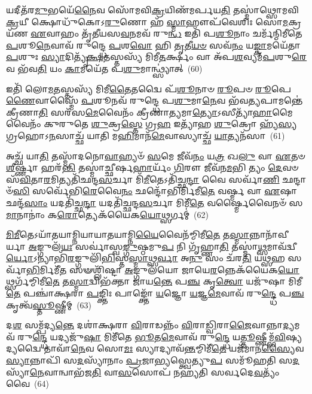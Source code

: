 𑌯𑌦𑍀𑌤᳴𑌰\-\ul{𑌮𑍁}\-𑌭𑌯𑍇᳴\-\ul{𑌨𑍈}\-𑌵 𑌸𑍋᳴𑌮𑌵𑌿\-\ul{𑌕𑍍𑌰}\-𑌯𑌿𑌣᳴𑌮𑌰𑍍𑌪𑌯\-\ul{𑌤𑌿} 𑌤𑌸𑍍𑌮𑌾॑𑌥𑍍𑌸𑍋𑌮𑌵𑌿\-\ul{𑌕𑍍𑌰}\-𑌯𑍀 𑌕𑍍𑌷𑍋𑌧𑍁᳴𑌕𑍋\-𑌽\-\ul{𑌰𑍁}\-𑌣𑍋 𑌹᳴ \ul{𑌸𑍍𑌮𑌾}\-𑌹𑍗𑌪᳴𑌵𑍇𑌶𑌿𑌃 𑌸𑍋\-\ul{𑌮}\-𑌕𑍍𑌰𑌯᳴𑌣 \ul{𑌏}\-𑌵𑌾𑌹𑌂 𑌤𑍃᳴𑌤𑍀𑌯𑌸\-\ul{𑌵}\-𑌨𑌮𑌵᳴ 𑌰𑍁\-\ul{𑌨𑍍𑌧} 𑌇𑌤𑌿᳴ 𑌪\-\ul{𑌶𑍂}\-𑌨𑌾𑌂 𑌚𑌰𑍍𑌮᳴𑌨𑍍𑌮𑌿𑌮𑍀𑌤𑍇 \ul{𑌪}\-𑌶𑍂\-\ul{𑌨𑍇}\-𑌵𑌾𑌵᳴ 𑌰𑍁𑌨𑍍𑌦𑍍𑌧𑍇 \ul{𑌪}\-𑌶\-\ul{𑌵𑍋} 𑌹𑌿 \ul{𑌤𑍃}\-𑌤𑍀\-\ul{𑌯}\-\-\ul{𑍞} 𑌸𑌵᳴\-\ul{𑌨𑌂} 𑌯\-\ul{𑌙𑍍𑌕𑌾}\-𑌮𑌯𑍇᳴𑌤𑌾\-\ul{𑌪}\-𑌶𑍁𑌃 \ul{𑌸𑍍𑌯𑌾}\-𑌦𑌿𑌤𑍍𑌯𑍃᳴\-\ul{𑌕𑍍𑌷}\-𑌤𑌸𑍍𑌤𑌸𑍍𑌯᳴ 𑌮𑌿𑌮𑍀\-\ul{𑌤}\-𑌰𑍍𑌕𑍍𑌷𑌂 𑌵𑌾 𑌅᳴𑌪\-\ul{𑌶}\-𑌵𑍍𑌯𑌮᳴\-\ul{𑌪}\-𑌶𑍁\-\ul{𑌰𑍇}\-𑌵 𑌭᳴𑌵\-\ul{𑌤𑌿} 𑌯𑌂 \ul{𑌕𑌾}\-𑌮𑌯𑍇᳴𑌤 𑌪\-\ul{𑌶𑍁}\-𑌮𑌾𑌨𑍍𑌥𑍍𑌸𑍍𑌯𑌾॑𑌤𑍍~(60)

𑌇𑌤𑌿᳴ 𑌲𑍋\-\ul{𑌮}\-𑌤𑌸𑍍𑌤𑌸𑍍𑌯᳴ 𑌮𑌿𑌮𑍀\-\ul{𑌤𑍈}\-𑌤𑌦𑍍𑌵𑍈 𑌪᳴\-\ul{𑌶𑍂}\-𑌨𑌾𑍞 \ul{𑌰𑍂}\-𑌪𑍞 \ul{𑌰𑍂}\-𑌪𑍇\-\ul{𑌣𑍈}\-𑌵𑌾𑌸𑍍𑌮𑍈᳴ \ul{𑌪}\-𑌶𑍂𑌨𑌵᳴ 𑌰𑍁𑌨𑍍𑌦𑍍𑌧𑍇 𑌪\-\ul{𑌶𑍁}\-𑌮𑌾\-\ul{𑌨𑍇}\-𑌵 𑌭᳴𑌵\-\ul{𑌤𑍍𑌯}\-𑌪𑌾𑌮𑌨𑍍𑌤𑍇॑ 𑌕𑍍𑌰𑍀𑌣𑌾\-\ul{𑌤𑌿} 𑌸𑌰᳴𑌸\-\ul{𑌮𑍇}\-𑌵𑍈𑌨𑌂᳴ 𑌕𑍍𑌰𑍀𑌣𑌾\-\ul{𑌤𑍍𑌯}\-𑌮𑌾\-\ul{𑌤𑍍𑌯𑍋}\-\-𑌽𑌸𑍀𑌤𑍍𑌯𑌾᳴\-\ul{𑌹𑌾}\-𑌮𑍈𑌵𑍈𑌨𑌂᳴ 𑌕𑍁𑌰𑍁𑌤𑍇 \ul{𑌶𑍁}\-𑌕𑍍𑌰\-\ul{𑌸𑍍𑌤𑍇} 𑌗𑍍𑌰\-\ul{𑌹} 𑌇𑌤𑍍𑌯𑌾᳴𑌹 \ul{𑌶𑍁}\-𑌕𑍍𑌰𑍋 𑌹𑍍𑌯᳴\-\ul{𑌸𑍍𑌯} 𑌗𑍍𑌰𑌹𑍋\-𑌽\-\ul{𑌨}\-𑌸𑌾𑌚𑍍𑌛᳴ 𑌯𑌾𑌤𑌿 𑌮\-\ul{𑌹𑌿}\-𑌮𑌾𑌨᳴\-\ul{𑌮𑍇}\-𑌵𑌾𑌸𑍍𑌯𑌾𑌚𑍍𑌛᳴ \ul{𑌯𑌾}\-𑌤𑍍𑌯𑌨᳴𑌸𑌾~(61)

𑌅𑌚𑍍𑌛᳴ 𑌯𑌾\-\ul{𑌤𑌿} 𑌤𑌸𑍍𑌮𑌾᳴𑌦𑌨𑍋\-\ul{𑌵𑌾}\-𑌹𑍍𑌯𑍞᳴ \ul{𑌸}\-𑌮𑍇 𑌜𑍀𑌵᳴\-\ul{𑌨𑌂} 𑌯\-\ul{𑌤𑍍𑌰} 𑌖\-\ul{𑌲𑍁} 𑌵𑌾 \ul{𑌏}\-𑌤𑍞 \ul{𑌶𑍀}\-𑌰𑍍\mbox{}𑌷𑍍𑌣𑌾 𑌹𑌰᳴\-\ul{𑌨𑍍𑌤𑌿} 𑌤𑌸𑍍𑌮𑌾॑𑌚𑍍𑌛𑍀𑌰𑍍\mbox{}𑌷\-\ul{𑌹𑌾}\-𑌰𑍍𑌯𑌂᳴ \ul{𑌗𑌿}\-𑌰𑍗 𑌜𑍀𑌵᳴𑌨\-\ul{𑌮}\-𑌭𑌿 𑌤𑍍𑌯𑌂 \ul{𑌦𑍇}\-𑌵𑍞 𑌸᳴\-\ul{𑌵𑌿}\-𑌤𑌾\-\ul{𑌰}\-𑌮𑌿𑌤𑍍𑌯𑌤𑌿᳴𑌛𑌨𑍍𑌦\-\ul{𑌸}\-𑌰𑍍𑌚𑌾 𑌮𑌿᳴\-\ul{𑌮𑍀}\-𑌤𑍇\-𑌽𑌤𑌿᳴𑌚𑍍𑌛\-\ul{𑌨𑍍𑌦𑌾} 𑌵𑍈 𑌸𑌰𑍍𑌵𑌾᳴\-\ul{𑌣𑌿} 𑌛𑌨𑍍𑌦𑌾𑍞᳴\-\ul{𑌸𑌿} 𑌸𑌰𑍍𑌵𑍇᳴𑌭𑌿\-\ul{𑌰𑍇}\-𑌵𑍈\-\ul{𑌨𑌂} 𑌛𑌨𑍍𑌦𑍋᳴𑌭𑌿𑌰𑍍𑌮𑌿𑌮𑍀\-\ul{𑌤𑍇} 𑌵𑌰𑍍\mbox{}\-\ul{𑌷𑍍𑌮} 𑌵𑌾 \ul{𑌏}\-𑌷𑌾 𑌛𑌨𑍍𑌦᳴\-\ul{𑌸𑌾𑌂} 𑌯𑌦𑌤𑌿᳴𑌚𑍍𑌛\-\ul{𑌨𑍍𑌦𑌾} 𑌯𑌦𑌤𑌿᳴𑌚𑍍𑌛𑌨𑍍𑌦\-\ul{𑌸}\-𑌰𑍍𑌚𑌾 𑌮𑌿𑌮𑍀᳴\-\ul{𑌤𑍇} 𑌵𑌰𑍍\mbox{}\-\ul{𑌷𑍍𑌮𑍈}\-𑌵𑍈𑌨𑍞᳴ 𑌸\-\ul{𑌮𑌾}\-𑌨𑌾𑌨𑌾𑌂॑ 𑌕\-\ul{𑌰𑍋}\-𑌤𑍍𑌯𑍇𑌕᳴𑌯𑍈𑌕\-\ul{𑌯𑍋}\-𑌥𑍍𑌸𑌰𑍍𑌗𑌮𑍍॑~(62)

\-\ul{𑌮𑌿}\-\-\ul{𑌮𑍀}\-𑌤𑍇\-𑌽𑌯𑌾᳴𑌤𑌯𑌾𑌮𑍍𑌨𑌿𑌯𑌾𑌯𑌾𑌤𑌯𑌾𑌮𑍍𑌨𑌿\-\ul{𑌯𑍈}\-𑌵𑍈𑌨᳴𑌮𑍍𑌮𑌿𑌮𑍀\-\ul{𑌤𑍇} 𑌤\-\ul{𑌸𑍍𑌮𑌾}\-𑌨𑍍𑌨𑌾𑌨𑌾᳴𑌵𑍀𑌰𑍍𑌯𑌾 \ul{𑌅}\-𑌙𑍍𑌗𑍁𑌲᳴\-\ul{𑌯𑌃} 𑌸𑌰𑍍𑌵𑌾॑𑌸𑍍𑌵\-\ul{𑌙𑍍𑌗𑍁}\-𑌷𑍍𑌠𑌮𑍁\-\ul{𑌪} 𑌨𑌿 𑌗𑍃᳴𑌹𑍍𑌣𑌾\-\ul{𑌤𑌿} 𑌤𑌸𑍍𑌮𑌾॑\-\ul{𑌥𑍍𑌸}\-𑌮𑌾𑌵᳴𑌦𑍍𑌵𑍀\-\ul{𑌰𑍍𑌯𑍋}\-\-𑌽𑌨𑍍𑌯𑌾𑌭𑌿᳴\-\ul{𑌰}\-𑌙𑍍𑌗𑍁𑌲𑌿᳴\-\ul{𑌭𑌿}\-𑌸𑍍𑌤\-\ul{𑌸𑍍𑌮𑌾}\-𑌥𑍍𑌸\-\ul{𑌰𑍍𑌵𑌾} 𑌅\-\ul{𑌨𑍁} 𑌸𑌂 𑌚᳴𑌰\-\ul{𑌤𑌿} 𑌯\-\ul{𑌥𑍍𑌸}\-𑌹 𑌸𑌰𑍍𑌵𑌾᳴\-\ul{𑌭𑌿}\-𑌰𑍍𑌮𑌿𑌮𑍀᳴\-\ul{𑌤} 𑌸𑍟𑌶𑍍𑌲𑌿᳴𑌷𑍍𑌟𑌾 \ul{𑌅}\-𑌙𑍍𑌗𑍁𑌲᳴𑌯𑍋 𑌜𑌾𑌯𑍇\-\ul{𑌰}\-𑌨𑍍𑌨𑍇𑌕᳴𑌯𑍈𑌕\-\ul{𑌯𑍋}\-𑌥𑍍𑌸𑌰𑍍𑌗᳴𑌮𑍍𑌮𑌿𑌮𑍀\-\ul{𑌤𑍇} 𑌤\-\ul{𑌸𑍍𑌮𑌾}\-𑌦𑍍𑌵𑌿𑌭᳴𑌕𑍍𑌤𑌾 𑌜𑌾𑌯\-\ul{𑌨𑍍𑌤𑍇} 𑌪\-\ul{𑌞𑍍𑌚} 𑌕𑍃\-\ul{𑌤𑍍𑌵𑍋} 𑌯𑌜𑍁᳴𑌷𑌾 𑌮𑌿𑌮𑍀\-\ul{𑌤𑍇} 𑌪𑌞𑍍𑌚𑌾॑𑌕𑍍𑌷𑌰𑌾 \ul{𑌪}\-𑌙𑍍𑌕𑍍𑌤𑌿𑌃 𑌪𑌾𑌙𑍍𑌕𑍍𑌤𑍋᳴ \ul{𑌯}\-𑌜𑍍𑌞𑍋 \ul{𑌯}\-𑌜𑍍𑌞\-\ul{𑌮𑍇}\-𑌵𑌾𑌵᳴ 𑌰𑍁\-\ul{𑌨𑍍𑌦𑍍𑌧𑍇} 𑌪\-\ul{𑌞𑍍𑌚} 𑌕𑍃𑌤𑍍𑌵᳴\-\ul{𑌸𑍍𑌤𑍂}\-𑌷𑍍𑌣𑍀𑌮𑍍~(63)

𑌦\-\ul{𑌶} 𑌸𑌮𑍍𑌪᳴𑌦𑍍𑌯\-\ul{𑌨𑍍𑌤𑍇} 𑌦𑌶𑌾॑𑌕𑍍𑌷𑌰𑌾 \ul{𑌵𑌿}\-𑌰𑌾𑌡𑌨𑍍𑌨𑌂᳴ \ul{𑌵𑌿}\-𑌰𑌾\-\ul{𑌡𑍍𑌵𑌿}\-𑌰𑌾\-\ul{𑌜𑍈}\-𑌵𑌾𑌨𑍍𑌨𑌾\-\ul{𑌦𑍍𑌯}\-𑌮𑌵᳴ 𑌰𑍁\-\ul{𑌨𑍍𑌦𑍍𑌧𑍇} 𑌯𑌦𑍍𑌯𑌜𑍁᳴\-\ul{𑌷𑌾} 𑌮𑌿𑌮𑍀᳴𑌤𑍇 \ul{𑌭𑍂}\-𑌤\-\ul{𑌮𑍇}\-𑌵𑌾𑌵᳴ 𑌰𑍁\-\ul{𑌨𑍍𑌦𑍍𑌧𑍇} 𑌯\-\ul{𑌤𑍍𑌤𑍂}\-𑌷𑍍𑌣𑍀𑌮𑍍𑌭᳴\-\ul{𑌵𑌿}\-𑌷𑍍𑌯𑌦𑍍𑌯𑌦𑍍𑌵𑍈 𑌤𑌾𑌵𑌾᳴\-\ul{𑌨𑍇}\-𑌵 𑌸𑍋\-\ul{𑌮𑌃} 𑌸𑍍𑌯𑌾𑌦𑍍𑌯𑌾𑌵᳴\-\ul{𑌨𑍍𑌤}\-𑌮𑍍𑌮𑌿𑌮𑍀᳴\-\ul{𑌤𑍇} 𑌯𑌜᳴𑌮𑌾𑌨\-\ul{𑌸𑍍𑌯𑍈}\-𑌵 \ul{𑌸𑍍𑌯𑌾}\-𑌨𑍍𑌨𑌾𑌪𑌿᳴ 𑌸\-\ul{𑌦}\-𑌸𑍍𑌯𑌾᳴𑌨𑌾𑌂 \ul{𑌪𑍍𑌰}\-𑌜𑌾\-\ul{𑌭𑍍𑌯}\-𑌸𑍍𑌤𑍍𑌵𑍇𑌤𑍍𑌯𑍁\-\ul{𑌪} 𑌸𑌮𑍂᳴𑌹𑌤𑌿 𑌸\-\ul{𑌦}\-𑌸𑍍𑌯𑌾᳴\-\ul{𑌨𑍇}\-𑌵𑌾𑌨𑍍𑌵𑌾𑌭᳴𑌜\-\ul{𑌤𑌿} 𑌵𑌾\-\ul{𑌸}\-𑌸𑍋𑌪᳴ 𑌨𑌹𑍍𑌯𑌤𑌿 𑌸𑌰𑍍𑌵𑌦𑍇\-\ul{𑌵}\-𑌤𑍍𑌯𑌂᳴ 𑌵𑍈~(64)

